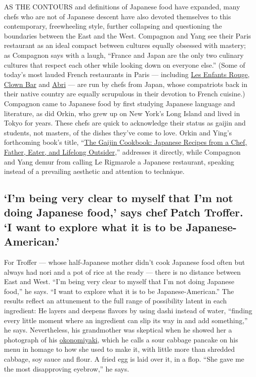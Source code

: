 AS THE CONTOURS and definitions of Japanese food have expanded, many
chefs who are not of Japanese descent have also devoted themselves to
this contemporary, freewheeling style, further collapsing and
questioning the boundaries between the East and the West. Compagnon and
Yang see their Paris restaurant as an ideal compact between cultures
equally obsessed with mastery; as Compagnon says with a laugh, ``France
and Japan are the only two culinary cultures that respect each other
while looking down on everyone else.'' (Some of today's most lauded
French restaurants in Paris --- including
\href{https://www.les-enfants-rouges.fr/}{Les Enfants Rouge},
\href{http://www.clown-bar-paris.com/}{Clown Bar} and
\href{https://www.lafourchette.com/restaurant/abri/308115?cc=18174-54f}{Abri}
--- are run by chefs from Japan, whose compatriots back in their native
country are equally scrupulous in their devotion to French cuisine.)
Compagnon came to Japanese food by first studying Japanese language and
literature, as did Orkin, who grew up on New York's Long Island and
lived in Tokyo for years. These chefs are quick to acknowledge their
status as gaijin and students, not masters, of the dishes they've come
to love. Orkin and Ying's forthcoming book's title,
``\href{https://www.hmhbooks.com/shop/books/The-Gaijin-Cookbook/9781328954350}{The
Gaijin Cookbook: Japanese Recipes from a Chef, Father, Eater, and
Lifelong Outsider},'' addresses it directly, while Compagnon and Yang
demur from calling Le Rigmarole a Japanese restaurant, speaking instead
of a prevailing aesthetic and attention to technique.

\hypertarget{im-being-very-clear-to-myself-that-im-not-doing-japanese-food-says-chef-patch-troffer-i-want-to-explore-what-it-is-to-be-japanese-american}{%
\subsection{`I'm being very clear to myself that I'm not doing Japanese
food,' says chef Patch Troffer. `I want to explore what it is to be
Japanese-American.'}\label{im-being-very-clear-to-myself-that-im-not-doing-japanese-food-says-chef-patch-troffer-i-want-to-explore-what-it-is-to-be-japanese-american}}

For Troffer --- whose half-Japanese mother didn't cook Japanese food
often but always had nori and a pot of rice at the ready --- there is no
distance between East and West. ``I'm being very clear to myself that
I'm not doing Japanese food,'' he says. ``I want to explore what it is
to be Japanese-American.'' The results reflect an attunement to the full
range of possibility latent in each ingredient: He layers and deepens
flavors by using dashi instead of water, ``finding every little moment
where an ingredient can slip its way in and add something,'' he says.
Nevertheless, his grandmother was skeptical when he showed her a
photograph of his
\href{https://cooking.nytimes3xbfgragh.onion/recipes/1020172-classic-okonomiyaki-japanese-cabbage-and-pork-pancakes}{okonomiyaki},
which he calls a sour cabbage pancake on his menu in homage to how she
used to make it, with little more than shredded cabbage, soy sauce and
flour. A fried egg is laid over it, in a flop. ``She gave me the most
disapproving eyebrow,'' he says.

